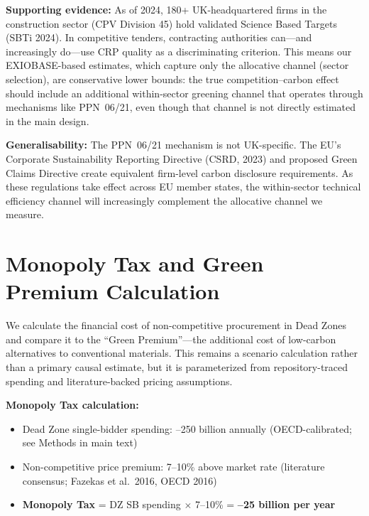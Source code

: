 \documentclass[11pt]{article}
\begin{document}
\textbf{Supporting evidence:} As of 2024, 180+ UK-headquartered firms in the construction sector (CPV Division 45) hold validated Science Based Targets (SBTi 2024). In competitive tenders, contracting authorities can---and increasingly do---use CRP quality as a discriminating criterion. This means our EXIOBASE-based estimates, which capture only the allocative channel (sector selection), are conservative lower bounds: the true competition--carbon effect should include an additional within-sector greening channel that operates through mechanisms like PPN~06/21, even though that channel is not directly estimated in the main design.

\textbf{Generalisability:} The PPN~06/21 mechanism is not UK-specific. The EU's Corporate Sustainability Reporting Directive (CSRD, 2023) and proposed Green Claims Directive create equivalent firm-level carbon disclosure requirements. As these regulations take effect across EU member states, the within-sector technical efficiency channel will increasingly complement the allocative channel we measure.

\section{Monopoly Tax and Green Premium Calculation}
\label{sec:monopoly_tax}

We calculate the financial cost of non-competitive procurement in Dead Zones and compare it to the ``Green Premium''---the additional cost of low-carbon alternatives to conventional materials. This remains a scenario calculation rather than a primary causal estimate, but it is parameterized from repository-traced spending and literature-backed pricing assumptions.

\textbf{Monopoly Tax calculation:}
\begin{itemize}
    \item Dead Zone single-bidder spending: --250 billion annually (OECD-calibrated; see Methods in main text)
    \item Non-competitive price premium: 7--10\% above market rate (literature consensus; Fazekas et al.\ 2016, OECD 2016)
    \item \textbf{Monopoly Tax} = DZ SB spending $\times$ 7--10\% = \textbf{--25 billion per year}
\end{itemize}
\end{document}
